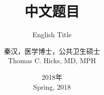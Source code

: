 \documentclass{beamer}
\begin{document}
\begin{CJK*}{UTF8}{gbsn}

	\title[中文题目]{中文题目}
	\subtitle{English Title}
	\author[秦汉]{秦汉，医学博士，公共卫生硕士\\ Thomas C. Hicks, MD, MPH}
	\date{2018年\\Spring, 2018}

\begin{frame}
	\titlepage
\end{frame}




\end{CJK*}
\end{document}
